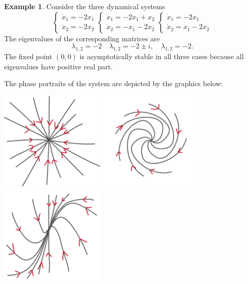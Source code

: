 \documentclass[hidelinks,a4paper, 11pt]{article}
\theoremstyle{plain}
\theoremstyle{break}
\theoremstyle{plain}
\theoremstyle{definition}
\newtheorem*{example}{Example}
\begin{document}
\begin{example}
	Consider the three dynamical systems
	\[
		\begin{cases}
			\dot x_1 = -2x_1 \\
			\dot x_2 = -2x_2
		\end{cases} 
		\begin{cases}
			\dot x_1 = -2x_1 +x_2\\
			\dot x_2 = -x_1-2x_2
		\end{cases}
		\begin{cases}
			\dot x_1 = -2x_1 \\
			\dot x_2 = x_1-2x_2
		\end{cases}
	\]
	The eigenvalues of the corresponding matrices are
	\[
		\lambda_{1,2} = -2 \quad \lambda_{1,2} = -2 \pm i, \quad \lambda_{1,2} = -2.
	\]
	The fixed point $(0,0)$ is asymptotically stable in all three cases because all eigenvalues have positive real part.
	
	The phase portraits of the system are depicted by the graphics below:
	
	\includegraphics[width=5cm]{phase_portrait_example1.png}
	\includegraphics[width=5cm]{phase_portrait_example2.png}
	\includegraphics[width=5cm]{phase_portrait_example3.png}
	

\end{example}
\end{document}

